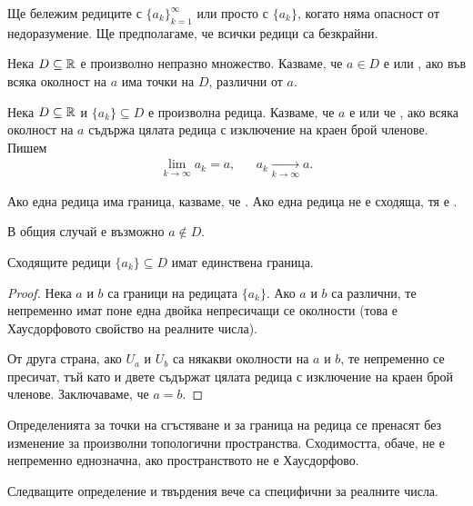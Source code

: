 \documentclass[numbers=endperiod, bibliography=totocnumbered]{scrartcl}
\begin{document}
Ще бележим редиците с \( {\{ a_k \}}_{k=1}^\infty \) или просто с \( \{ a_k \} \), когато няма опасност от недоразумение. Ще предполагаме, че всички редици са безкрайни.

\begin{definition}
  Нека \( D \subseteq \mathbb{R} \) е произволно непразно множество. Казваме, че \( a \in D \) е  или , ако във всяка околност на \( a \) има точки на \( D \), различни от \( a \).
\end{definition}

\begin{definition}
  Нека \( D \subseteq \mathbb{R} \) и \( \{ a_k \} \subseteq D \) е произволна редица. Казваме, че \( a \) е  или че , ако всяка околност на \( a \) съдържа цялата редица с изключение на краен брой членове. Пишем
  \begin{align*}
    \lim_{k \to \infty} a_k = a,
    &&
    a_k \underset {k \to \infty} \longrightarrow a.
  \end{align*}

  Ако една редица има граница, казваме, че . Ако една редица не е сходяща, тя е .
\end{definition}
\begin{note}
  В общия случай е възможно \( a \not\in D \).
\end{note}

\begin{proposition}
  Сходящите редици \( \{ a_k \} \subseteq D \) имат единствена граница.
\end{proposition}
\begin{proof}
  Нека \( a \) и \( b \) са граници на редицата \( \{ a_k \} \). Ако \( a \) и \( b \) са различни, те непременно имат поне една двойка непресичащи се околности (това е Хаусдорфовото свойство на реалните числа).

  От друга страна, ако \( U_a \) и \( U_b \) са някакви околности на \( a \) и \( b \), те непременно се пресичат, тъй като и двете съдържат цялата редица с изключение на краен брой членове. Заключаваме, че \( a = b \).
\end{proof}

\begin{note}
  Определенията за точки на сгъстяване и за граница на редица се пренасят без изменение за произволни топологични пространства. Сходимостта, обаче, не е непременно еднозначна, ако пространството не е Хаусдорфово.

  Следващите определение и твърдения вече са специфични за реалните числа.
\end{note}
\end{document}
